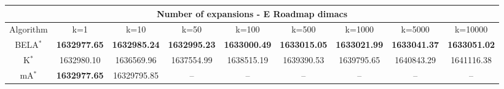 \begin{tabular}{c|cccccccc}\toprule
\multicolumn{9}{c}{Number of expansions - E Roadmap dimacs}\\ \midrule
Algorithm & k=1 & k=10 & k=50 & k=100 & k=500 & k=1000 & k=5000 & k=10000 \\ \midrule
BELA$^*$ & \textbf{1632977.65} & \textbf{1632985.24} & \textbf{1632995.23} & \textbf{1633000.49} & \textbf{1633015.05} & \textbf{1633021.99} & \textbf{1633041.37} & \textbf{1633051.02} \\
K$^*$ & 1632980.10 & 1636569.96 & 1637554.99 & 1638515.19 & 1639390.53 & 1639795.65 & 1640843.29 & 1641116.38 \\
mA$^*$ & \textbf{1632977.65} & 16329795.85 & -- & -- & -- & -- & -- & -- \\ \bottomrule 
\end{tabular}
